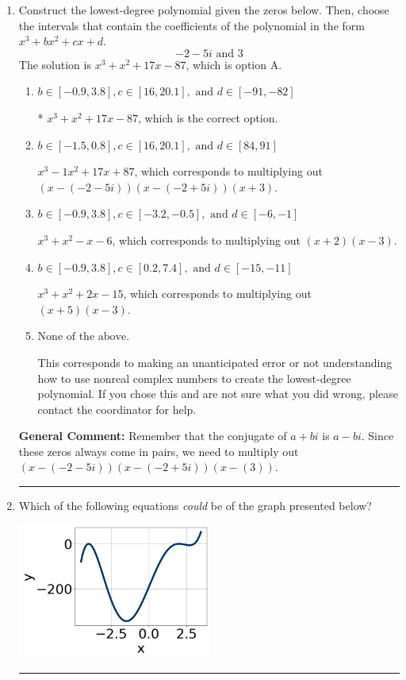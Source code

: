 \documentclass{extbook}[14pt]
\newcommand{\litem}[1]{\item #1

\rule{\textwidth}{0.4pt}}
\begin{document}
\begin{enumerate}\litem{
Construct the lowest-degree polynomial given the zeros below. Then, choose the intervals that contain the coefficients of the polynomial in the form $x^3+bx^2+cx+d$.
\[ -2 - 5 i \text{ and } 3 \]The solution is \( x^{3} + x^{2} +17 x -87 \), which is option A.\begin{enumerate}[label=\Alph*.]
\item \( b \in [-0.9, 3.8], c \in [16, 20.1], \text{ and } d \in [-91, -82] \)

* $x^{3} + x^{2} +17 x -87$, which is the correct option.
\item \( b \in [-1.5, 0.8], c \in [16, 20.1], \text{ and } d \in [84, 91] \)

$x^{3} -1 x^{2} +17 x + 87$, which corresponds to multiplying out $(x-(-2 - 5 i))(x-(-2 + 5 i))(x + 3)$.
\item \( b \in [-0.9, 3.8], c \in [-3.2, -0.5], \text{ and } d \in [-6, -1] \)

$x^{3} + x^{2} -x -6$, which corresponds to multiplying out $(x + 2)(x -3)$.
\item \( b \in [-0.9, 3.8], c \in [0.2, 7.4], \text{ and } d \in [-15, -11] \)

$x^{3} + x^{2} +2 x -15$, which corresponds to multiplying out $(x + 5)(x -3)$.
\item \( \text{None of the above.} \)

This corresponds to making an unanticipated error or not understanding how to use nonreal complex numbers to create the lowest-degree polynomial. If you chose this and are not sure what you did wrong, please contact the coordinator for help.
\end{enumerate}

\textbf{General Comment:} Remember that the conjugate of $a+bi$ is $a-bi$. Since these zeros always come in pairs, we need to multiply out $(x-(-2 - 5 i))(x-(-2 + 5 i))(x-(3))$.
}
\litem{
Which of the following equations \textit{could} be of the graph presented below?

\begin{center}
    \includegraphics[width=0.5\textwidth]{../Figures/polyGraphToFunctionC.png}
\end{center}


}
\end{enumerate}
\end{document}
